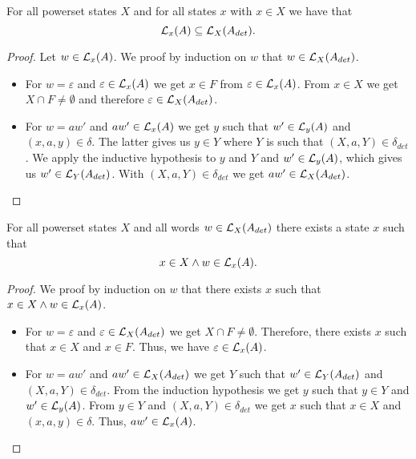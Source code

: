     \begin{lemma}
        \label{nfa_to_dfa_complete}
        For all powerset states $X$ and for all states $x$ with $x \in X$ we have that
        \begin{equation*}
            \mathcal{L}_{x}(A) \subseteq \mathcal{L}_{X}(A_{det}).
        \end{equation*}
    \end{lemma}

    \begin{proof}
        Let $w \in \mathcal{L}_{x}(A)$. We proof by induction on $w$ that $w \in \mathcal{L}_{X}(A_{det})$. 
        \begin{itemize}
            \item
                For $w = \varepsilon$ and $\varepsilon \in \mathcal{L}_{x}(A)$ we get $x \in F$ from $\varepsilon \in \mathcal{L}_{x}(A)$. 
                From $x \in X$ we get $X \cap F \neq \emptyset$ and therefore $\varepsilon \in \mathcal{L}_{X}(A_{det})$.
            \item
                For $w = a w'$ and $a w' \in \mathcal{L}_{x}(A)$ we get $y$ such that $w' \in \mathcal{L}_{y}(A)$ and $(x,a,y) \in \delta$.
                The latter gives us $y \in Y$ where $Y$ is such that $(X, a, Y) \in \delta_{det}$.
                We apply the inductive hypothesis to $y$ and $Y$ and $w' \in \mathcal{L}_{y}(A)$, 
                which gives us $w' \in \mathcal{L}_{Y}(A_{det})$.
                With $(X, a, Y) \in \delta_{det}$ we get $a w' \in \mathcal{L}_{X}(A_{det})$.
        \end{itemize}
    \end{proof}


    \begin{lemma}
        \label{nfa_to_dfa_sound}
        For all powerset states $X$ and all words $w \in \mathcal{L}_{X}(A_{det})$ there exists a state $x$ such that 
        \begin{equation*}
            x \in X \wedge
            w \in \mathcal{L}_{x}(A).
        \end{equation*}
    \end{lemma}

    \begin{proof}
        We proof by induction on $w$ that there exists $x$ such that $x \in X \wedge w \in \mathcal{L}_{x}(A)$. 
        \begin{itemize}
            \item
                For $w = \varepsilon$ and $\varepsilon \in \mathcal{L}_{X}(A_{det})$ we get  $X \cap F \neq \emptyset$.
                Therefore, there exists $x$ such that $x \in X$ and $x \in F$.
                Thus, we have $\varepsilon \in \mathcal{L}_{x}(A)$.
            \item
                For $w = a w'$ and $a w' \in \mathcal{L}_{X}(A_{det})$ we get $Y$ such that $w' \in \mathcal{L}_{Y}(A_{det})$ and $(X,a,Y) \in \delta_{det}$.
                From the induction hypothesis we get $y$ such that $y \in Y$ and $w' \in \mathcal{L}_{y}(A)$.
                From $y \in Y$ and $(X, a, Y) \in \delta_{det}$ we get $x$ such that $x \in X$ and $(x, a, y) \in \delta$.
                Thus, $a w' \in \mathcal{L}_{x}(A)$.
        \end{itemize}
    \end{proof}


